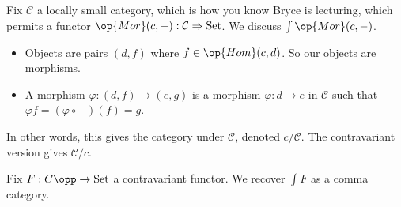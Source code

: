 \documentclass[../notes.tex]{subfiles}
\begin{document}
\begin{example}
	Fix $\mathcal C$ a locally small category, which is how you know Bryce is lecturing, which permits a functor $\op{Mor}(c,-):\mathcal C\Rightarrow\mathrm{Set}$. We discuss $\int\op{Mor}(c,-)$.
	\begin{itemize}
		\item Objects are pairs $(d,f)$ where $f\in\op{Hom}(c,d)$. So our objects are morphisms.
		\item A morphism $\varphi:(d,f)\to(e,g)$ is a morphism $\varphi:d\to e$ in $\mathcal C$ such that $\varphi f=(\varphi\circ-)(f)=g$.
	\end{itemize}
	In other words, this gives the category under $\mathcal C$, denoted $c/\mathcal C$. The contravariant version gives $\mathcal C/c$.
\end{example}
\begin{exe}
	Fix $F:C\opp\to\mathrm{Set}$ a contravariant functor. We recover $\int F$ as a comma category.
\end{exe}
\end{document}
